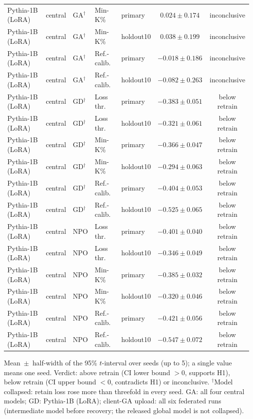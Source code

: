 \begin{table}[t]
\begin{tabular*}{\textwidth}{@{\extracolsep{\fill}}lllllcc@{}}
Pythia-1B (LoRA) & central & GA$^{\dagger}$ & Min-K\% & primary & $0.024 \pm 0.174$ & inconclusive \\
Pythia-1B (LoRA) & central & GA$^{\dagger}$ & Min-K\% & holdout10 & $0.038 \pm 0.199$ & inconclusive \\
Pythia-1B (LoRA) & central & GA$^{\dagger}$ & Ref.-calib. & primary & $-0.018 \pm 0.186$ & inconclusive \\
Pythia-1B (LoRA) & central & GA$^{\dagger}$ & Ref.-calib. & holdout10 & $-0.082 \pm 0.263$ & inconclusive \\
Pythia-1B (LoRA) & central & GD$^{\dagger}$ & Loss thr. & primary & $-0.383 \pm 0.051$ & below retrain \\
Pythia-1B (LoRA) & central & GD$^{\dagger}$ & Loss thr. & holdout10 & $-0.321 \pm 0.061$ & below retrain \\
Pythia-1B (LoRA) & central & GD$^{\dagger}$ & Min-K\% & primary & $-0.366 \pm 0.047$ & below retrain \\
Pythia-1B (LoRA) & central & GD$^{\dagger}$ & Min-K\% & holdout10 & $-0.294 \pm 0.063$ & below retrain \\
Pythia-1B (LoRA) & central & GD$^{\dagger}$ & Ref.-calib. & primary & $-0.404 \pm 0.053$ & below retrain \\
Pythia-1B (LoRA) & central & GD$^{\dagger}$ & Ref.-calib. & holdout10 & $-0.525 \pm 0.065$ & below retrain \\
Pythia-1B (LoRA) & central & NPO & Loss thr. & primary & $-0.401 \pm 0.040$ & below retrain \\
Pythia-1B (LoRA) & central & NPO & Loss thr. & holdout10 & $-0.346 \pm 0.049$ & below retrain \\
Pythia-1B (LoRA) & central & NPO & Min-K\% & primary & $-0.385 \pm 0.032$ & below retrain \\
Pythia-1B (LoRA) & central & NPO & Min-K\% & holdout10 & $-0.320 \pm 0.046$ & below retrain \\
Pythia-1B (LoRA) & central & NPO & Ref.-calib. & primary & $-0.421 \pm 0.056$ & below retrain \\
Pythia-1B (LoRA) & central & NPO & Ref.-calib. & holdout10 & $-0.547 \pm 0.072$ & below retrain \\
\bottomrule
\end{tabular*}

\smallskip
{\footnotesize Mean~$\pm$~half-width of the 95\% $t$-interval over seeds (up to 5); a single value means one seed. Verdict: above retrain (CI lower bound $>0$, supports H1), below retrain (CI upper bound $<0$, contradicts H1) or inconclusive. $^{\dagger}$Model collapsed: retain loss rose more than threefold in every seed. GA: all four central models; GD: Pythia-1B (LoRA); client-GA upload: all six federated runs (intermediate model before recovery; the released global model is not collapsed).\par}
\end{table}
